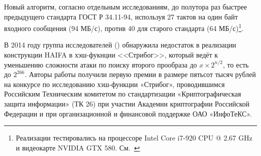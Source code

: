 Новый алгоритм, согласно отдельным исследованиям, до полутора раз быстрее предыдущего стандарта ГОСТ Р 34.11-94, используя 27 тактов на один байт входного сообщения (94 МБ/с), против 40 для старого стандарта (64 МБ/с)\footnote{Реализации тестировались на процессоре Intel Core i7-920 CPU @ 2.67 GHz и видеокарте NVIDIA GTX 580. См.~\cite{Lebedev:2013}}.

В 2014 году группа исследователей (\cite{Guo:Jean:Leurent:Peyrin:Wang:2014}) обнаружила недостаток в реализации конструкции HAIFA в хэш-фукнции <<Стрибог>>, который ведёт к уменьшению сложности атаки по поиску второго прообраза до $x \times 2^{n/2}$, то есть до $2^{266}$. Авторы работы получили первую премии в размере пятьсот тысяч рублей на конкурсе по исследованию хэш-функции «Стрибог», проводившимся Российским Техническим комитетом по стандартизации «Криптографическая защита информации» (ТК 26) при участии Академии криптографии Российской Федерации и при организационной и финансовой поддержке ОАО «ИнфоТеКС».

